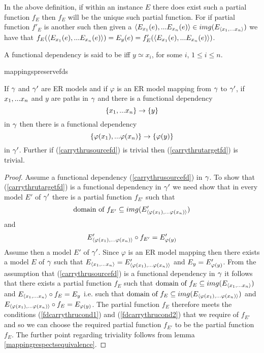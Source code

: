 \begin{remark}
In the above definition, if within an instance $E$ there does exist such a partial function $f_E$ then $f_E$ will be the unique such partial function. For if partial function $f'_E$ is another such then given a $\langle E_{x_1}(e),...E_{x_n}(e)\rangle \in img(E_{\langle x_1,...x_n\rangle})$
we have that $f_E(\langle E_{x_1}(e),...E_{x_n}(e)\rangle)=E_y(e)=f'_E(\langle E_{x_1}(e),...E_{x_n}(e)\rangle)$.
\end{remark}

\begin{definition}
A functional dependency  is said to be  iff $y\simeq x_i$, for some $i$, $1 \leq i \leq n$.
\end{definition}

mappingspreservefds
\begin{lemma}
\label{mappingspreservefds}
If $\gamma$ and $\gamma'$ are ER models and  if  $\varphi$ is an ER model mapping from $\gamma$  to $\gamma'$,  if $x_1,...x_n$ and $y$ are paths in $\gamma$
and there is a  functional dependency
\begin{equation}
\label{carrythrusourcefd}
\left\{x_1,...x_n\right\} \rightarrow \left\{y\right\}
\end{equation} 
in $\gamma$ then there is a functional dependency
\begin{equation}
\label{carrythrutargetfd}
\left\{\varphi(x_1),...\varphi(x_n)\right\} \rightarrow \left\{\varphi(y)\right\}
\end{equation}
in $\gamma'$.
Further if (\ref{carrythrusourcefd}) is trivial then (\ref{carrythrutargetfd}) is trivial.
\end{lemma}
\begin{proof}
Assume a functional dependency (\ref{carrythrusourcefd})  in $\gamma$. To show that (\ref{carrythrutargetfd}) is a functional dependency in $\gamma'$
we need show that in every model $E'$ 
of $\gamma'$ there is a partial function $f_{E'}$ such that
\begin{equation}
\label{fdcarrythrucond1}
\mbox{domain of }f_{E'} \subseteq img(E'_{\langle\varphi(x_1),...\varphi(x_n)\rangle})
\end{equation}
and
\begin{equation}
\label{fdcarrythrucond2}
E'_{\langle\varphi(x_1),...\varphi(x_n)\rangle} \circ f_{E'} = E'_{\varphi(y)}
\end{equation}
Assume then a model $E'$ of $\gamma'$. 
Since $\varphi$ is an ER model mapping then there exists a model $E$ of $\gamma$ such that 
$E_{\langle x_1,...x_n\rangle} = E'_{\langle\varphi(x_1),...\varphi(x_n)\rangle}$ and $E_y = E'_{\varphi(y)}$. From the assumption that (\ref{carrythrusourcefd})
is a functional dependency in $\gamma$ it follows that there exists a  partial function $f_E$ such that
$\mbox{domain of }f_{E} \subseteq img(E_{\langle x_1,...x_n\rangle})$
and
$E_{\langle x_1,...x_n\rangle} \circ f_{E} = E_y$ 
i.e. such that 
$\mbox{domain of }f_{E} \subseteq img(E_{\langle\varphi(x_1),...\varphi(x_n)\rangle})$
and
$E_{\langle\varphi(x_1),...\varphi(x_n)\rangle} \circ f_{E} = E_{\varphi(y)}$.  The partial function $f_E$ therefore 
meets the conditions (\ref{fdcarrythrucond1}) and (\ref{fdcarrythrucond2}) that
we require of $f_{E'}$ and so we can choose the required partial function
$f_{E'}$ to be the partial function $f_E$. 
The further point regarding triviality follows from lemma \ref{mappingrespectsequivalence}.
\end{proof}




